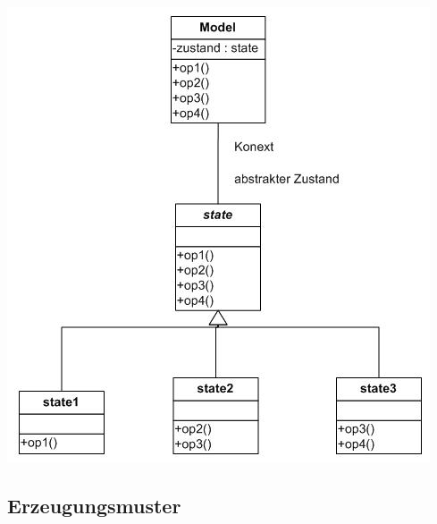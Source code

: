 \documentclass[11pt, fleqn, a4paper, leqno]{scrartcl} %
\begin{document}
			\includegraphics[scale=0.6]{images/state.jpg}
			\newpage
		\subsection{Erzeugungsmuster}
\end{document}
